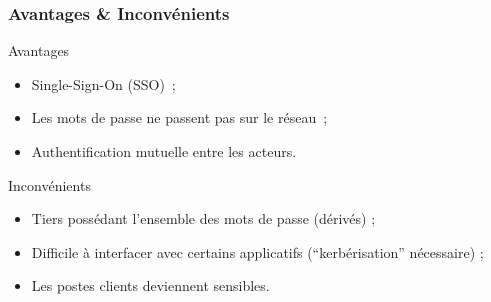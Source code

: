 \documentclass[svgnames]{beamer}
\begin{document}
\begin{frame}
\begin{figure}[h!t]
\begin{center}
    \end{center}    
  \end{figure}
 
\end{frame}


\begin{frame}
 \frametitle{Avantages \& Inconvénients}
 
 \begin{exampleblock}{Avantages}
  \begin{itemize}
   \item Single-Sign-On (SSO)~;
   \item Les mots de passe ne passent pas sur le réseau~;
   \item Authentification mutuelle entre les acteurs.
  \end{itemize}
 \end{exampleblock}
 
 \pause
 
 \begin{alertblock}{Inconvénients}
  \begin{itemize}
   \item Tiers possédant l'ensemble des mots de passe (dérivés) ;
   \item Difficile à interfacer avec certains applicatifs (``kerbérisation'' nécessaire) ;
   \item Les postes clients deviennent sensibles. %
  \end{itemize}
 \end{alertblock}
\end{frame}
\end{document}
